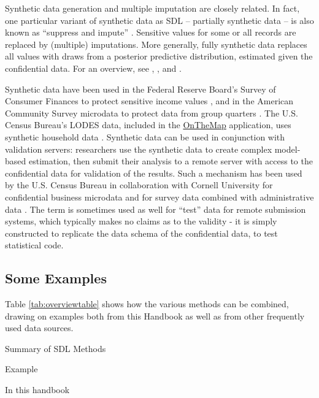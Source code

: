 \documentclass[
]{book}
\begin{document}
Synthetic data generation and multiple imputation are closely related. In fact, one particular variant of synthetic data as SDL -- partially synthetic data -- is also known as ``suppress and impute'' \citep{little_statistical_1993}. Sensitive values for some or all records are replaced by (multiple) imputations. More generally, fully synthetic data \citep{rubin_discussion_1993} replaces all values with draws from a posterior predictive distribution, estimated given the confidential data. For an overview, see \citet{raghunathan_multiple_2003}, \citet{little_statistical_2004}, and \citet{drechsler_synthetic_2011}.

Synthetic data have been used in the Federal Reserve Board's Survey of Consumer Finances to protect sensitive income values \citep{kennickell_multiple_1998}, and in the American Community Survey microdata to protect data from group quarters \citep[such as prisons and university residences; see][]{hawala_disclosure_2009}. The U.S. Census Bureau's LODES data, included in the \href{https://onthemap.ces.census.gov/}{OnTheMap} application, uses synthetic household data \citep{machanavajjhala_privacy_2008}. Synthetic data can be used in conjunction with validation servers: researchers use the synthetic data to create complex model-based estimation, then submit their analysis to a remote server with access to the confidential data for validation of the results. Such a mechanism has been used by the U.S. Census Bureau in collaboration with Cornell University for confidential business microdata \citep{kinney_towards_2011} and for survey data combined with administrative data \citep{abowd_final_2006}. The term is sometimes used as well for ``test'' data for remote submission systems, which typically makes no claims as to the validity - it is simply constructed to replicate the data schema of the confidential data, to test statistical code.

\hypertarget{some-examples}{%
\subsection{Some Examples}\label{some-examples}}

Table \ref{tab:overviewtable} shows how the various methods can be combined, drawing on examples both from this Handbook as well as from other frequently used data sources.

\label{tab:overviewtable}Summary of SDL Methods

Example

In this handbook
\end{document}
